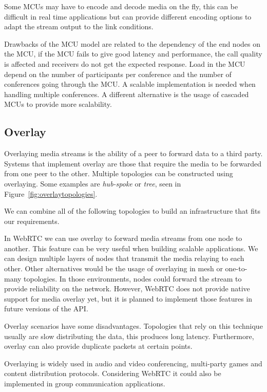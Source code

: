 Some MCUs may have to encode and decode media on the fly, this can be difficult in real time applications but can provide different encoding options to adapt the stream output to the link conditions. 

Drawbacks of the MCU model are related to the dependency of the end nodes on the MCU, if the MCU fails to give good latency and performance, the call quality is affected and receivers do not get the expected response. Load in the MCU depend on the number of participants per conference and the number of conferences going through the MCU. A scalable implementation is needed when handling multiple conferences. A different alternative is the usage of cascaded MCUs to provide more scalability.  

\subsection{Overlay}

Overlaying media streams is the ability of a peer to forward data to a third party. Systems that implement overlay are those that require the media to be forwarded from one peer to the other. Multiple topologies can be constructed using overlaying. Some examples are {\it hub-spoke} or {\it tree}, seen in Figure~\ref{fig:overlaytopologies}.

We can combine all of the following topologies to build an infrastructure that fits our requirements. 

In WebRTC we can use overlay to forward media streams from one node to another. This feature can be very useful when building scalable applications. We can design multiple layers of nodes that transmit the media relaying to each other. Other alternatives would be the usage of overlaying in mesh or one-to-many topologies. In those environments, nodes could forward the stream to provide reliability on the network. However, WebRTC does not provide native support for media overlay yet, but it is planned to implement those features in future versions of the API.

Overlay scenarios have some disadvantages. Topologies that rely on this technique usually are slow distributing the data, this produces long latency. Furthermore, overlay can also provide duplicate packets at certain points.

Overlaying is widely used in audio and video conferencing, multi-party games and content distribution protocols. Considering WebRTC it could also be implemented in group communication applications. 
 
